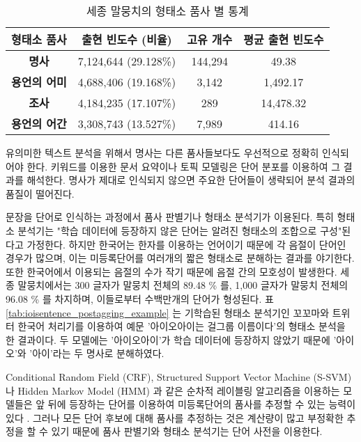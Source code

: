 \documentclass[oneside, ko,phd]{snuthesis_utf8_kor}
\begin{document}
\begin{table}[ht]
  \centering
  \caption{세종 말뭉치의 형태소 품사 별 통계}
  \label{tab:pos_statistics}
\begin{tabular}{|>{}c |c|c|c|}
\hline
\textbf{형태소 품사}  & \textbf{출현 빈도수 (비율)} & \textbf{고유 개수} & \textbf{평균 출현 빈도수} \\ \hline
\textbf{명사} & 7,124,644 (29.128\%) & 144,294 & 49.38 \\ \hline
\textbf{용언의 어미} & 4,688,406 (19.168\%) & 3,142 & 1,492.17  \\ \hline
\textbf{조사} & 4,184,235 (17.107\%) & 289  & 14,478.32 \\ \hline
\textbf{용언의 어간} & 3,308,743 (13.527\%) & 7,989 & 414.16  \\ \hline
\end{tabular}
\end{table}

유의미한 텍스트 분석을 위해서 명사는 다른 품사들보다도 우선적으로 정확히 인식되어야 한다.
키워드를 이용한 문서 요약이나 토픽 모델링은 단어 분포를 이용하여 그 결과를 해석한다.
명사가 제대로 인식되지 않으면 주요한 단어들이 생략되어 분석 결과의 품질이 떨어진다.

문장을 단어로 인식하는 과정에서 품사 판별기나 형태소 분석기가 이용된다.
특히 형태소 분석기는 "학습 데이터에 등장하지 않은 단어는 알려진 형태소의 조합으로 구성"된다고 가정한다.
하지만 한국어는 한자를 이용하는 언어이기 때문에 각 음절이 단어인 경우가 많으며, 이는 미등록단어를 여러개의 짧은 형태소로 분해하는 결과를 야기한다.
또한 한국어에서 이용되는 음절의 수가 작기 때문에 음절 간의 모호성이 발생한다.
세종 말뭉치에서는 300 글자가 말뭉치 전체의 89.48 \% 를, 1,000 글자가 말뭉치 전체의 96.08 \% 를 차지하며, 이들로부터 수백만개의 단어가 형성된다.
표 \ref{tab:ioisentence_postagging_example} 는 기학습된 형태소 분석기인 꼬꼬마와 트위터 한국어 처리기를 이용하여 예문 '아이오아이는 걸그룹 이름이다'의 형태소 분석을 한 결과이다.
두 모델에는 '아이오아이'가 학습 데이터에 등장하지 않았기 때문에 '아이오'와 '아이'라는 두 명사로 분해하였다.

Conditional Random Field (CRF), Structured Support Vector Machine (S-SVM) 나 Hidden Markov Model (HMM) 과 같은 순차적 레이블링 알고리즘을 이용하는 모델들은 앞 뒤에 등장하는 단어를 이용하여 미등록단어의 품사를 추정할 수 있는 능력이 있다 \cite{shim2004high, shim2007made, na2012crfs, lee2013joint}.
그러나 모든 단어 후보에 대해 품사를 추정하는 것은 계산량이 많고 부정확한 추정을 할 수 있기 때문에 품사 판별기와 형태소 분석기는 단어 사전을 이용한다.
\end{document}
